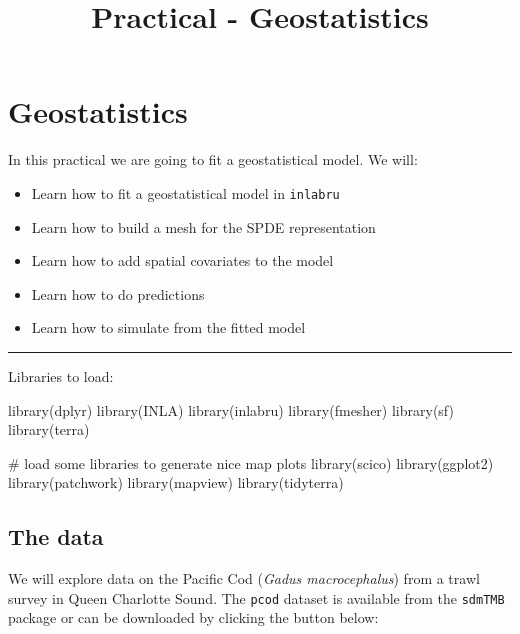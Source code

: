 \documentclass[
  letterpaper,
  DIV=11,
  numbers=noendperiod]{scrartcl}
\title{Practical - Geostatistics}
\author{}
\date{}
\makeatletter
\newenvironment{Shaded}{\begin{snugshade}}{\end{snugshade}}
\newcommand{\CommentTok}[1]{\textcolor[rgb]{0.37,0.37,0.37}{#1}}
\newcommand{\FunctionTok}[1]{\textcolor[rgb]{0.28,0.35,0.67}{#1}}
\newcommand{\NormalTok}[1]{\textcolor[rgb]{0.00,0.23,0.31}{#1}}
\renewcommand{\maketitle}{\bgroup\setlength{\parindent}{0pt}
\begin{flushleft}
  {\sffamily\huge\textbf{\MakeUppercase{\@title}}} \vspace{0.3cm} \newline
  {\Large {\@subtitle}} \newline
  \@author
\end{flushleft}\egroup
}
\makeatother
\begin{document}
\maketitle

\pagestyle{mystyle}


\section{Geostatistics}\label{geostatistics}

In this practical we are going to fit a geostatistical model. We will:

\begin{itemize}
\item
  Learn how to fit a geostatistical model in \texttt{inlabru}
\item
  Learn how to build a mesh for the SPDE representation
\item
  Learn how to add spatial covariates to the model
\item
  Learn how to do predictions
\item
  Learn how to simulate from the fitted model
\end{itemize}

\begin{center}\rule{0.5\linewidth}{0.5pt}\end{center}

Libraries to load:

\begin{Shaded}
\begin{Highlighting}[]
\FunctionTok{library}\NormalTok{(dplyr)}
\FunctionTok{library}\NormalTok{(INLA)}
\FunctionTok{library}\NormalTok{(inlabru)}
\FunctionTok{library}\NormalTok{(fmesher)}
\FunctionTok{library}\NormalTok{(sf)}
\FunctionTok{library}\NormalTok{(terra)}


\CommentTok{\# load some libraries to generate nice map plots}
\FunctionTok{library}\NormalTok{(scico)}
\FunctionTok{library}\NormalTok{(ggplot2)}
\FunctionTok{library}\NormalTok{(patchwork)}
\FunctionTok{library}\NormalTok{(mapview)}
\FunctionTok{library}\NormalTok{(tidyterra)}
\end{Highlighting}
\end{Shaded}

\subsection{The data}\label{the-data}

We will explore data on the Pacific Cod (\emph{Gadus macrocephalus})
from a trawl survey in Queen Charlotte Sound. The \texttt{pcod} dataset
is available from the \texttt{sdmTMB} package or can be downloaded by
clicking the button below:
\end{document}
